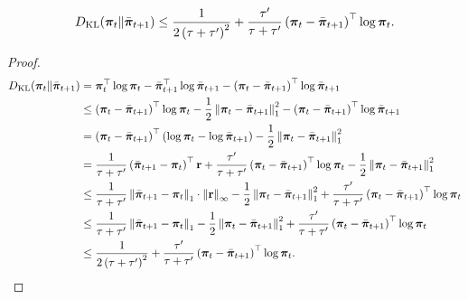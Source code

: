 \begin{lem}
\label{lem:kl_t_bar_tp1_bound}
\begin{equation*}
\begin{split}
    D_{\mathrm{KL}}{\left( {\boldsymbol{\pi}}_t \middle\| \bar{{\boldsymbol{\pi}}}_{t+1} \right)} \le \frac{1}{2\left(\tau + \tau^\prime\right)^2} + \frac{\tau^\prime}{\tau + \tau^\prime} \left( {\boldsymbol{\pi}}_t - \bar{{\boldsymbol{\pi}}}_{t+1} \right)^\top \log{{\boldsymbol{\pi}}_t}.
\end{split}
\end{equation*}
\end{lem}
\begin{proof}
\begin{equation*}
\begin{split}
    D_{\mathrm{KL}}{\left( {\boldsymbol{\pi}}_t \middle\| \bar{{\boldsymbol{\pi}}}_{t+1} \right)} &= {\boldsymbol{\pi}}_t^\top \log{{\boldsymbol{\pi}}_t} - \bar{{\boldsymbol{\pi}}}_{t+1}^\top \log{\bar{{\boldsymbol{\pi}}}_{t+1}} - \left( {\boldsymbol{\pi}}_t - \bar{{\boldsymbol{\pi}}}_{t+1} \right)^\top \log{\bar{{\boldsymbol{\pi}}}_{t+1}} \\
    &\le \left( {\boldsymbol{\pi}}_t - \bar{{\boldsymbol{\pi}}}_{t+1} \right)^\top \log{{\boldsymbol{\pi}}_t} - \frac{1}{2} \left\| {\boldsymbol{\pi}}_t - \bar{{\boldsymbol{\pi}}}_{t+1} \right\|_1^2 - \left( {\boldsymbol{\pi}}_t - \bar{{\boldsymbol{\pi}}}_{t+1} \right)^\top \log{\bar{{\boldsymbol{\pi}}}_{t+1}} \\
    &= \left( {\boldsymbol{\pi}}_t - \bar{{\boldsymbol{\pi}}}_{t+1} \right)^\top \left( \log{{\boldsymbol{\pi}}_t} - \log{\bar{{\boldsymbol{\pi}}}_{t+1}} \right) - \frac{1}{2} \left\| {\boldsymbol{\pi}}_t - \bar{{\boldsymbol{\pi}}}_{t+1} \right\|_1^2 \\
    &= \frac{1}{\tau + \tau^\prime} \left( \bar{{\boldsymbol{\pi}}}_{t+1} - {\boldsymbol{\pi}}_t \right)^\top {\mathbf{r}} + \frac{\tau^\prime}{\tau + \tau^\prime} \left( {\boldsymbol{\pi}}_t - \bar{{\boldsymbol{\pi}}}_{t+1} \right)^\top \log{{\boldsymbol{\pi}}_t} - \frac{1}{2} \left\| {\boldsymbol{\pi}}_t - \bar{{\boldsymbol{\pi}}}_{t+1} \right\|_1^2 \\
    &\le \frac{1}{\tau + \tau^\prime} \left\| \bar{{\boldsymbol{\pi}}}_{t+1} - {\boldsymbol{\pi}}_t \right\|_1 \cdot \left\| {\mathbf{r}} \right\|_\infty - \frac{1}{2} \left\| {\boldsymbol{\pi}}_t - \bar{{\boldsymbol{\pi}}}_{t+1} \right\|_1^2 + \frac{\tau^\prime}{\tau + \tau^\prime} \left( {\boldsymbol{\pi}}_t - \bar{{\boldsymbol{\pi}}}_{t+1} \right)^\top \log{{\boldsymbol{\pi}}_t} \\
    &\le \frac{1}{\tau + \tau^\prime} \left\| \bar{{\boldsymbol{\pi}}}_{t+1} - {\boldsymbol{\pi}}_t \right\|_1  - \frac{1}{2} \left\| {\boldsymbol{\pi}}_t - \bar{{\boldsymbol{\pi}}}_{t+1} \right\|_1^2 + \frac{\tau^\prime}{\tau + \tau^\prime} \left( {\boldsymbol{\pi}}_t - \bar{{\boldsymbol{\pi}}}_{t+1} \right)^\top \log{{\boldsymbol{\pi}}_t} \\
    &\le \frac{1}{2\left(\tau + \tau^\prime\right)^2} + \frac{\tau^\prime}{\tau + \tau^\prime} \left( {\boldsymbol{\pi}}_t - \bar{{\boldsymbol{\pi}}}_{t+1} \right)^\top \log{{\boldsymbol{\pi}}_t}. \qedhere
\end{split}
\end{equation*}
\end{proof}

